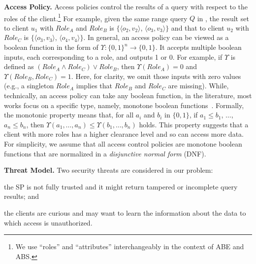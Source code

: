\textbf{Access Policy.}
Access policies control the results of a query with respect to the roles of the client.\footnote{We use ``roles'' and ``attributes'' interchangeably in the context of ABE and ABS.}
For example, given the same range query $Q$ in , the result set to client $u_1$ with $Role_A$ and $Role_B$ is $\{\langle o_2, v_2\rangle$, $\langle o_3, v_3\rangle\}$ and that to client $u_2$ with $Role_C$ is $\{\langle o_3, v_3\rangle$, $\langle o_4, v_4\rangle\}$. In general, an access policy can be viewed as a boolean function in the form of $\Upsilon : {\{0, 1\}}^n \to \{0, 1\}$. It accepts multiple boolean inputs, each corresponding to a role, and outputs 1 or 0. For example, if $\Upsilon$ is defined as $({Role}_A \land {Role}_C) \lor {Role}_B$, then $\Upsilon({Role}_A) = 0$ and $\Upsilon({Role}_B, {Role}_C) = 1$. Here, for clarity, we omit those inputs with zero values (e.g., a singleton $Role_A$ implies that $Role_B$ and $Role_C$ are missing). While, technically, an access policy can take any boolean function, in the literature, most works focus on a specific type, namely, monotone boolean functions~\cite{10.1145/1180405.1180418,10.1109/sp.2007.11,10.1007/978-3-642-19074-2_24,10.1145/1755688.1755697}. Formally, the monotonic property means that, for all $a_i$ and $b_i$ in $\{0, 1\}$, if $a_1 \le b_1$, $\dots$, $a_n \le b_n$, then $\Upsilon(a_1, \dots, a_n) \le \Upsilon(b_1, \dots, b_n)$ holds. This property suggests that a client with more roles has a higher clearance level and so can access more data. %
For simplicity, we assume that all access control policies are monotone boolean functions that are normalized in a \emph{disjunctive normal form} (DNF).

\textbf{Threat Model.}
Two security threats are considered in our problem:
\begin{inlineenum}
\item the SP is not fully trusted and it might return tampered or incomplete query results; and
\item the clients are curious and may want to learn the information about the data to which access is unauthorized.
\end{inlineenum}


